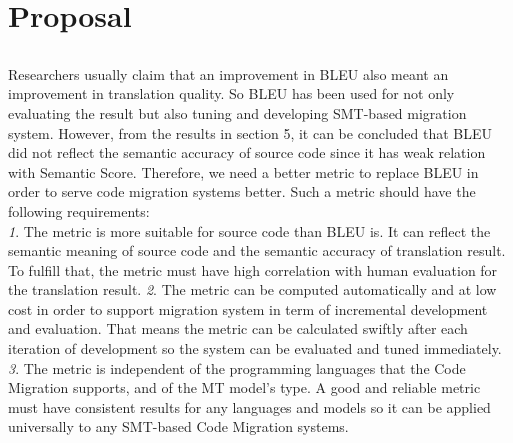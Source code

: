 \section{Proposal}
\subsection{\model}
Researchers usually claim that an improvement in BLEU also meant an improvement in translation quality. So BLEU has been used for not only evaluating the result but also tuning and developing SMT-based migration system. %
However, from the results in section 5, it can be concluded that BLEU did not reflect the semantic accuracy of source code since it has weak relation with Semantic Score. Therefore, we need a better metric to replace BLEU in order to serve code migration systems better. 
Such a metric should have the following requirements:\\ \emph{1}. The metric is more suitable for source code than BLEU is. It can reflect the semantic meaning of source code and the semantic accuracy of translation result. To fulfill that, the metric must have high correlation with human evaluation for the translation result. \emph{2}. The metric can be computed automatically and at low cost in order to support migration system in term of incremental development and evaluation. That means the metric can be calculated swiftly after each iteration of development so the system can be evaluated and tuned immediately. \emph{3}. The metric is independent of the programming languages that the Code Migration supports, and of the MT model's type. A good and reliable metric must have consistent results for any languages and models so it can be applied universally to any SMT-based Code Migration systems.  

